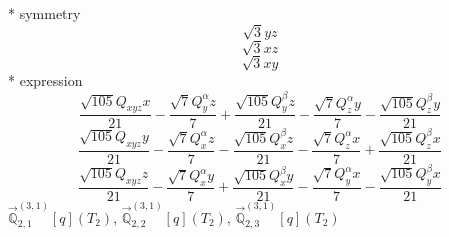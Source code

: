 \documentclass[fleqn,8pt]{jsarticle}
\begin{document}
\noindent\quad ** symmetry
\begin{dmath*}
\sqrt{3} y z
\end{dmath*}
\begin{dmath*}
\sqrt{3} x z
\end{dmath*}
\begin{dmath*}
\sqrt{3} x y
\end{dmath*}
\noindent\quad ** expression
\begin{dmath*}
\frac{\sqrt{105} Q_{xyz} x}{21} - \frac{\sqrt{7} Q_{y}^{\alpha} z}{7} + \frac{\sqrt{105} Q_{y}^{\beta} z}{21} - \frac{\sqrt{7} Q_{z}^{\alpha} y}{7} - \frac{\sqrt{105} Q_{z}^{\beta} y}{21}
\end{dmath*}
\begin{dmath*}
\frac{\sqrt{105} Q_{xyz} y}{21} - \frac{\sqrt{7} Q_{x}^{\alpha} z}{7} - \frac{\sqrt{105} Q_{x}^{\beta} z}{21} - \frac{\sqrt{7} Q_{z}^{\alpha} x}{7} + \frac{\sqrt{105} Q_{z}^{\beta} x}{21}
\end{dmath*}
\begin{dmath*}
\frac{\sqrt{105} Q_{xyz} z}{21} - \frac{\sqrt{7} Q_{x}^{\alpha} y}{7} + \frac{\sqrt{105} Q_{x}^{\beta} y}{21} - \frac{\sqrt{7} Q_{y}^{\alpha} x}{7} - \frac{\sqrt{105} Q_{y}^{\beta} x}{21}
\end{dmath*}
\noindent\quad $\vec{\mathbb{Q}}_{2,1}^{(3,1)}[q](T_{2})$, $\vec{\mathbb{Q}}_{2,2}^{(3,1)}[q](T_{2})$, $\vec{\mathbb{Q}}_{2,3}^{(3,1)}[q](T_{2})$
\end{document}
